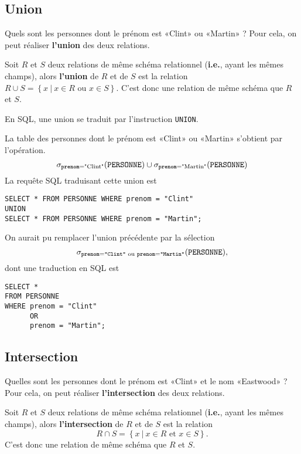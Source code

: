 \subsection{Union}
Quels sont les personnes dont le prénom est «Clint» ou «Martin» ? Pour cela, on peut réaliser  \textbf{l'union} des deux relations.

\begin{defi}[Union]
  Soit $R$ et $S$ deux relations de même schéma relationnel (\textbf{i.e.}, ayant les mêmes champs), alors \textbf{l'union} de $R$ et de $S$ est la relation  $ R\cup S = \left\{x ~|~ x\in R\textrm{ ou }x\in S\right\}.$
  C'est donc une relation de même schéma que $R$ et $S$.
\end{defi}

En SQL, une union se traduit par l'instruction \texttt{UNION}.
\begin{exemple}
La table des personnes dont le prénom est «Clint» ou «Martin» s'obtient par l'opération.
\begin{equation*}
  \sigma_{\mathtt{prenom}=\text{"Clint"}}(\mathtt{PERSONNE})\cup \sigma_{\mathtt{prenom}=\text{"Martin"}}(\mathtt{PERSONNE})
\end{equation*}
La requête SQL traduisant cette union est 
\begin{verbatim}
SELECT * FROM PERSONNE WHERE prenom = "Clint"
UNION
SELECT * FROM PERSONNE WHERE prenom = "Martin";
\end{verbatim}
\end{exemple}
\begin{rem}
  On aurait pu remplacer l'union précédente par la sélection 
  \begin{equation*}
    \sigma_{\mathtt{prenom}=\texttt{"Clint"}\textrm{ ou }\mathtt{prenom}=\texttt{"Martin"}}(\mathtt{PERSONNE}),
  \end{equation*}
  dont une traduction en SQL est 
\begin{verbatim}
SELECT * 
FROM PERSONNE
WHERE prenom = "Clint"
      OR 
      prenom = "Martin";
\end{verbatim}
\end{rem}

\subsection{Intersection}

Quelles sont les personnes dont le prénom est «Clint» et le nom
«Eastwood» ? Pour cela, on peut réaliser  \textbf{l'intersection} des deux relations.
\begin{defi}[Intersection]
  Soit $R$ et $S$ deux relations de même schéma relationnel (\textbf{i.e.}, ayant les mêmes champs), alors \textbf{l'intersection} de $R$ et de $S$ est la relation 
  \begin{equation*}
    R\cap S = \left\{x ~|~ x\in R\textrm{ et }x\in S\right\}.
  \end{equation*}
  C'est donc une relation de même schéma que $R$ et $S$.
\end{defi}

